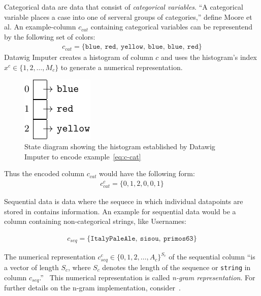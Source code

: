 Categorical data are data that consist of \emph{categorical variables}.
``A categorical variable places a case into one of serveral groups of categories,{''} define Moore et al.\cite[p.~4]{MOO11}
An example-column \( c_{cat} \) containing categorical variables can be representend by the following set of colors:
\begin{align}\label{eq:c-cat}
    c_{cat} = \{ \texttt{blue},~\texttt{red},~\texttt{yellow},~\texttt{blue},~\texttt{blue},~\texttt{red} \}
\end{align}
Datawig Imputer creates a histogram of column \( c \) and uses the histogram's index \( x^c \in \{1, 2, \dots, M_c \} \) to generate a numerical representation.
\begin{figure}[ht]
    \centering
    \includegraphics[width=.3\textwidth]{images/state_diagrams/color_histogram}
    \caption{State diagram showing the histogram established by Datawig Imputer to encode example~\ref{eq:c-cat}}
    \label{fig:state-diagram-color}
\end{figure}
Thus the encoded column \( c_{cat} \) would have the following form:
\begin{align}
    c_{cat}^{c} = \{ 0, 1, 2, 0, 0, 1\}
\end{align}

Sequential data is data where the sequece in which individual datapoints are stored in contains information.
An example for sequential data would be a column containing non-categorical strings, like Usernames:

\begin{align}
    c_{seq} = \{ \texttt{ItalyPaleAle},~\texttt{sisou},~\texttt{primos63} \}
\end{align}

The numerical representation \( c_{seq}^{c} \in \{ 0, 1, 2, \dots, A_c \}^{S_c} \) of the sequential column ``is a vector of length \( S_c \), where \( S_c \) denotes the length of the sequence or \texttt{string} in column \( c_{seq} \).''~\cite[p.~2020]{BIE18}
This numerical representation is called \emph{n-gram representation}.
For further details on the n-gram implementation, consider~\cite[p.~2020]{BIE18}.

